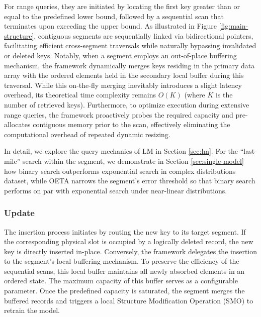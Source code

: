 For range queries, they are initiated by locating the first key greater than or equal to the predefined lower bound, followed by a sequential scan that terminates upon exceeding the upper bound. As illustrated in Figure \ref{fig:main-structure}, contiguous segments are sequentially linked via bidirectional pointers, facilitating efficient cross-segment traversals while naturally bypassing invalidated or deleted keys. Notably, when a segment employs an out-of-place buffering mechanism, the framework dynamically merges keys residing in the primary data array with the ordered elements held in the secondary local buffer during this traversal. While this on-the-fly merging inevitably introduces a slight latency overhead, its theoretical time complexity remains $O(K)$ (where $K$ is the number of retrieved keys). Furthermore, to optimize execution during extensive range queries, the framework proactively probes the required capacity and pre-allocates contiguous memory prior to the scan, effectively eliminating the computational overhead of repeated dynamic resizing.

In detail, we explore the query mechanics of LM in Section \ref{sec:lm}. For the ``last-mile'' search within the segment, we demonstrate in Section \ref{sec:single-model} how binary search outperforms exponential search in complex distributions dataset, while OETA narrows the segment's error threshold so that binary search performs on par with exponential search under near-linear distributions.


\subsubsection{Update}
\label{sec:update}
The insertion process initiates by routing the new key to its target segment. If the corresponding physical slot is occupied by a logically deleted record, the new key is directly inserted in-place. Conversely, the framework delegates the insertion to the segment's local buffering mechanism. To preserve the efficiency of the sequential scans, this local buffer maintains all newly absorbed elements in an ordered state. The maximum capacity of this buffer serves as a configurable parameter. Once the predefined capacity is saturated, the segment merges the buffered records and triggers a local Structure Modification Operation (SMO) to retrain the model.

